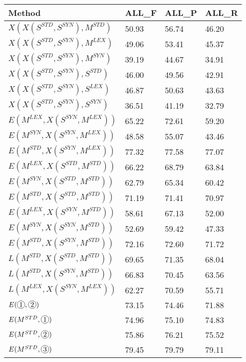 \begin{table*}[]
\centering
\begin{tabular}{@{\makebox[2.5em][l]{\rownumber\space}}llll@{}}
\toprule

\textbf{Method} & \textbf{ALL\_F} & \textbf{ALL\_P} & \textbf{ALL\_R} \\ \midrule


%
$X(X(S^{STD}, S^{SYN}), M^{STD})$  & 50.93           & 56.74           & 46.20\\ 
$X(X(S^{STD}, S^{SYN}), M^{LEX})$  & 49.06          & 53.41           & 45.37\\ 
$X(X(S^{STD}, S^{SYN}), M^{SYN})$  & 39.19           & 44.67           & 34.91 \\ 
\midrule
%
$X(X(S^{STD}, S^{SYN}), S^{STD})$  & 46.00           & 49.56           & 42.91\\ 
$X(X(S^{STD}, S^{SYN}), S^{LEX})$  & 46.87          & 50.63           & 43.63\\ 
$X(X(S^{STD}, S^{SYN}), S^{SYN})$  & 36.51           & 41.19           & 32.79 \\ 
\midrule
$E(M^{LEX}, X(S^{SYN}, M^{LEX}))$      & 65.22	&	72.61	&	59.20           \\
$E(M^{SYN}, X(S^{SYN}, M^{LEX}))$      & 48.58	&	55.07	&	43.46           \\ 
$E(M^{STD}, X(S^{SYN}, M^{LEX}))$      & 77.32	&	77.58	&	77.07			\\
\midrule
$E(M^{LEX}, X(S^{STD}, M^{STD}))$      & 66.22	&	68.79	&	63.84           \\
$E(M^{SYN}, X(S^{STD}, M^{STD}))$      & 62.79	&	65.34	&	60.42          \\ 
$E(M^{STD}, X(S^{STD}, M^{STD}))$      & 71.19	&	71.41	&	70.97           \\
\midrule
$E(M^{LEX}, X(S^{SYN}, M^{STD}))$      & 58.61	&	67.13	&	52.00           \\
$E(M^{SYN}, X(S^{SYN}, M^{STD}))$      & 52.69	&	59.42	&	47.33          \\ 
\gdef\rownumber{\circlednumber{\stepcounter{magicrownumbers}\arabic{magicrownumbers}}}%
$E(M^{STD}, X(S^{SYN}, M^{STD}))$      & 72.16	&	72.60	&	71.72           \\
\midrule
%
$L(M^{STD}, X(S^{STD}, M^{STD}))$      & 69.65           & 71.35          & 68.04           \\ 
$L(M^{STD}, X(S^{SYN}, M^{STD}))$      & 66.83           & 70.45          & 63.56           \\ 
$L(M^{LEX}, X(S^{SYN}, M^{LEX}))$      & 62.27           & 70.59           & 55.71           \\  
\midrule
%
$E(\circlednumber{1}, \circlednumber{2})$      & 73.15          & 74.46           & 71.88	          \\ \midrule
%
$E(M^{STD},\circlednumber{1})$      & 74.96          & 75.10     & 74.83	  \\
$E(M^{STD}, \circlednumber{2})$      & 75.86          & 76.21  & 75.52	  \\
$E(M^{STD},\circlednumber{3})$      & 79.45          & 79.79  & 79.11	  \\


\end{tabular}
\end{table*}
